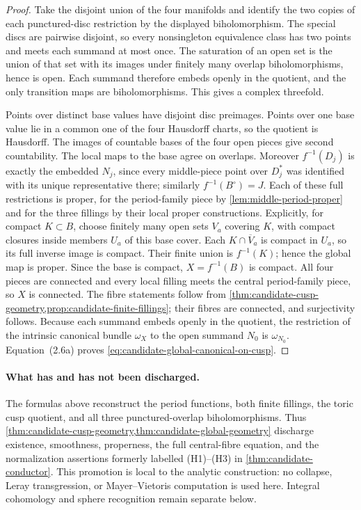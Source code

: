 \begin{proof}
Take the disjoint union of the four manifolds and identify the two copies of
each punctured-disc restriction by the displayed biholomorphism.  The special
discs are pairwise disjoint, so every nonsingleton equivalence class has two
points and meets each summand at most once.  The saturation of an open set is
the union of that set with its images under finitely many overlap
biholomorphisms, hence is open.  Each summand therefore embeds openly in the
quotient, and the only transition maps are biholomorphisms.  This gives a
complex threefold.

Points over distinct base values have disjoint disc preimages.  Points over
one base value lie in a common one of the four Hausdorff charts, so the
quotient is Hausdorff.  The images of countable bases of the four open
pieces give second countability.  The local maps to the base agree on
overlaps.  Moreover \(f^{-1}(D_j)\) is exactly the embedded \(N_j\),
since every middle-piece point over \(D_j^*\) was identified with its
unique representative there; similarly \(f^{-1}(B^\circ)=J\).  Each
of these full restrictions is proper, for the period-family piece by
\cref{lem:middle-period-proper} and for the three fillings by their local
proper constructions.  Explicitly, for compact \(K\subset B\), choose
finitely many open sets \(V_a\) covering \(K\), with compact closures
inside members \(U_a\) of this base cover.  Each
\(K\cap\overline V_a\) is compact in \(U_a\), so its full inverse
image is compact.  Their finite union is \(f^{-1}(K)\); hence the global
map is proper.  Since the base is compact, \(X=f^{-1}(B)\) is compact.
All four pieces are connected and every local filling meets the central
period-family piece, so \(X\) is connected.  The fibre statements follow
from \cref{thm:candidate-cusp-geometry,prop:candidate-finite-fillings}; their
fibres are connected, and surjectivity follows.
Because each summand embeds openly in the quotient, the restriction of the
intrinsic canonical bundle \(\omega_X\) to the open summand \(N_0\) is
\(\omega_{N_0}\).  Equation~(2.6a) proves
\cref{eq:candidate-global-canonical-on-cusp}.
\end{proof}

\paragraph{What has and has not been discharged.}
The formulas above reconstruct the period functions, both finite fillings,
the toric cusp quotient, and all three punctured-overlap biholomorphisms.
Thus \cref{thm:candidate-cusp-geometry,thm:candidate-global-geometry}
discharge existence, smoothness, properness,
the full central-fibre equation, and the normalization assertions formerly
labelled (H1)--(H3) in \cref{thm:candidate-conductor}.  This promotion is
local to the analytic construction: no collapse, Leray transgression, or
Mayer--Vietoris computation is used here.  Integral cohomology and sphere
recognition remain separate below.
